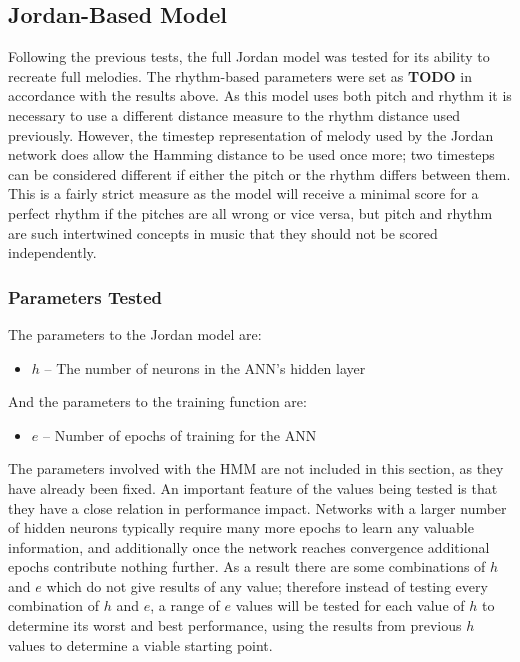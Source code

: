 \documentclass[ author={Stephen Livermore-Tozer},
				supervisor={Dr. Peter Flach},
				degree={MEng},
				title={Algorithmic Co-composition Using Machine Learning},
				subtitle={},
				type={research},
				year={2016} ]{dissertation}
\begin{document}
	
	\subsection{Jordan-Based Model}
	
	Following the previous tests, the full Jordan model was tested for its ability to recreate full melodies. The rhythm-based parameters were set as \textbf{TODO} in accordance with the results above. As this model uses both pitch and rhythm it is necessary to use a different distance measure to the rhythm distance used previously. However, the timestep representation of melody used by the Jordan network does allow the Hamming distance to be used once more; two timesteps can be considered different if either the pitch or the rhythm differs between them. This is a fairly strict measure as the model will receive a minimal score for a perfect rhythm if the pitches are all wrong or vice versa, but pitch and rhythm are such intertwined concepts in music that they should not be scored independently.
	
	\subsubsection{Parameters Tested}
	
	The parameters to the Jordan model are:
	\begin{itemize}
		\item $h$ -- The number of neurons in the ANN's hidden layer
	\end{itemize}
	And the parameters to the training function are:
	\begin{itemize}
		\item $e$ -- Number of epochs of training for the ANN
	\end{itemize}
	
	The parameters involved with the HMM are not included in this section, as they have already been fixed. An important feature of the values being tested is that they have a close relation in performance impact. Networks with a larger number of hidden neurons typically require many more epochs to learn any valuable information, and additionally once the network reaches convergence additional epochs contribute nothing further. As a result there are some combinations of $h$ and $e$ which do not give results of any value; therefore instead of testing every combination of $h$ and $e$, a range of $e$ values will be tested for each value of $h$ to determine its worst and best performance, using the results from previous $h$ values to determine a viable starting point. 
	
\end{document}
